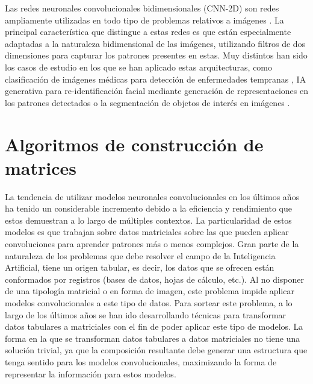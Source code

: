 \documentclass{uathesis-es}
\begin{document}
Las redes neuronales convolucionales bidimensionales (CNN-2D) son redes ampliamente utilizadas en todo tipo de problemas relativos a imágenes \cite{9451544}. La principal característica que distingue a estas redes es que están especialmente adaptadas a la naturaleza bidimensional de las imágenes, utilizando filtros de dos dimensiones para capturar los patrones presentes en estas. Muy distintos han sido los casos de estudio en los que se han aplicado estas arquitecturas, como clasificación de imágenes médicas para detección de enfermedades tempranas \cite{7064414}, IA generativa para re-identificación facial \cite{6909616} mediante generación de representaciones en los patrones detectados o la segmentación de objetos de interés en imágenes \cite{long2015fully}.

\section{Algoritmos de construcción de matrices}
\label{SOAT_MATRIX_ALGORITHM_CONSTRUCTION}

La tendencia de utilizar modelos neuronales convolucionales en los últimos años ha tenido un considerable incremento debido a la eficiencia y rendimiento que estos demuestran a lo largo de múltiples contextos. La particularidad de estos modelos es que trabajan sobre datos matriciales sobre las que pueden aplicar convoluciones para aprender patrones más o menos complejos. Gran parte de la naturaleza de los problemas que debe resolver el campo de la Inteligencia Artificial, tiene un origen tabular, es decir, los datos que se ofrecen están conformados por registros (bases de datos, hojas de cálculo, etc.). Al no disponer de una tipología matricial o en forma de imagen, este problema impide aplicar modelos convolucionales a este tipo de datos. Para sortear este problema, a lo largo de los últimos años se han ido desarrollando técnicas para transformar datos tabulares a matriciales con el fin de poder aplicar este tipo de modelos. La forma en la que se transforman datos tabulares a datos matriciales no tiene una solución trivial, ya que la composición resultante debe generar una estructura que tenga sentido para los modelos convolucionales, maximizando la forma de representar la información para estos modelos. 
\end{document}
